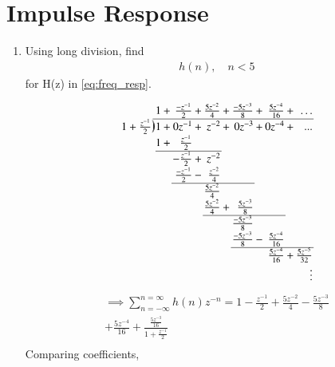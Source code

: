 \documentclass[journal,12pt,twocolumn]{IEEEtran}
\renewcommand\thesection{\arabic{section}}
\newcommand{\longdiv}{\smash{\mkern-0.43mu\vstretch{1.31}{\hstretch{.7}{)}}\mkern-5.2mu\vstretch{1.31}{\hstretch{.7}{)}}}}
\begin{document}
\section{Impulse Response}
\begin{enumerate}[label=\thesection.\arabic*]
\item Using long division, 
find
\begin{align}
	h(n), \quad n < 5
\end{align}
for H(z) in 
\eqref{eq:freq_resp}.
\solution


\[
\arraycolsep=1pt
\renewcommand\arraystretch{1.2}
\begin{array}{*1r @{\hskip\arraycolsep}c@{\hskip\arraycolsep} *{11}r}
	&          & 1 & + & \frac{-z^{-1}}{2} & + & \frac{5z^{-2}}{4} & + & \frac{-5z^{-3}}{8} & + & \frac{5z^{-4}}{16}& + & \dots  \\
	\cline{2-13}
	1+\frac{z^{-1}}{2} & \longdiv & 1 & + & 0z^{-1}& + & z^{-2} &+& 0z^{-3} &+&0z^{-4}&+&... \\
	&          & 1 & + &\frac{z^{-1}}{2} &  &   &   &      &   &      &   &        \\
	\cline{3-7}
	&          &   &   & -\frac{z^{-1}}{2} & + &  z^{-2} &   &      &   &      &   &        \\
	&          &   &   & \frac{-z^{-1}}{2} & - &  \frac{z^{-2}}{4} &  &   &   &      &   &        \\
	\cline{5-9}
	&          &   &   &   &   & \frac{5z^{-2}}{4} &  &  &   &      &   &        \\
	&          &   &   &   &   & \frac{5z^{-2}}{4} & + & \frac{5z^{-3}}{8} &   &  &   &        \\
	\cline{7-11}
	&          &   &   &   &   &      &   & \frac{-5z^{-3}}{8} &   &  &   &        \\
	&          &   &   &   &   &      &   & \frac{-5z^{-3}}{8} & - & \frac{5z^{-4}}{16} &  &    \\
	\cline{9-13}
	&          &   &   &   &   &      &   &      &   &\frac{5z^{-4}}{16}& + & \frac{5z^{-5}}{32}   \\
	&          &   &   &   &   &      &   &      &   &      &   & \vdots \\
\end{array}
\]
%
\begin{multline}
	\implies \sum_{n=-\infty}^{n=\infty}h(n)z^{-n}=1-\frac{z^{-1}}{2}+\frac{5z^{-2}}{4}-\frac{5z^{-3}}{8}\\+\frac{5z^{-4}}{16}+\frac{\frac{5z^{-3}}{16}}{1+\frac{z^{-1}}{2}}\\
\end{multline}
Comparing coefficients,


\end{enumerate}
\end{document}
